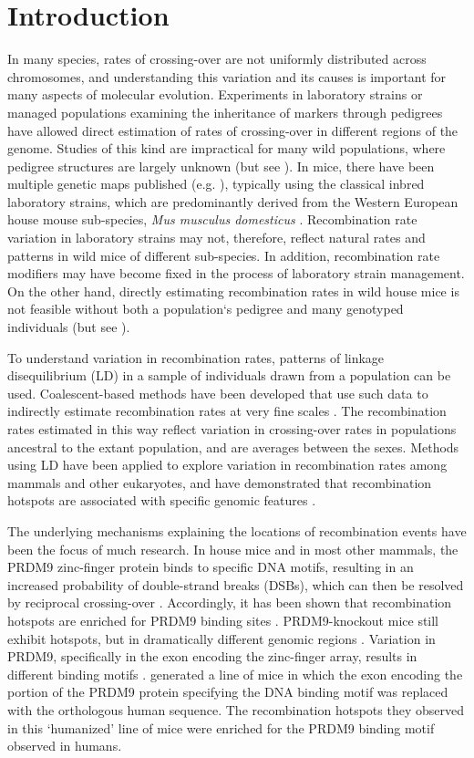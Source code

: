 \section{Introduction}
In many species, rates of crossing-over are not uniformly distributed across chromosomes, and understanding this variation and its causes is important for many aspects of molecular evolution. Experiments in laboratory strains or managed populations examining the inheritance of markers through pedigrees have allowed direct estimation of rates of crossing-over in different regions of the genome. Studies of this kind are impractical for many wild populations, where pedigree structures are largely unknown (but see \citealt{RN250}). In mice, there have been multiple genetic maps published (e.g. \citealt{RN184, RN263, RN232, RN266}), typically using the classical inbred laboratory strains, which are predominantly derived from the Western European house mouse sub-species, \emph{Mus musculus domesticus} \citep{RN243}. Recombination rate variation in laboratory strains may not, therefore, reflect natural rates and patterns in wild mice of different sub-species. In addition, recombination rate modifiers may have become fixed in the process of laboratory strain management. On the other hand, directly estimating recombination rates in wild house mice is not feasible without both a population`s pedigree and many genotyped individuals (but see \citealt{RN267}). 
 
        	To understand variation in recombination rates, patterns of linkage disequilibrium (LD) in a sample of individuals drawn from a population can be used. Coalescent-based methods have been developed that use such data to indirectly estimate recombination rates at very fine scales \citep{RN261,RN182, RN257,RN260,RN213}. The recombination rates estimated in this way reflect variation in crossing-over rates in populations ancestral to the extant population, and are averages between the sexes. Methods using LD have been applied to explore variation in recombination rates among mammals and other eukaryotes, and have demonstrated that recombination hotspots are associated with specific genomic features \citep{RN262, RN247, RN258}.

The underlying mechanisms explaining the locations of recombination events have been the focus of much research. In house mice and in most other mammals, the PRDM9 zinc-finger protein binds to specific DNA motifs, resulting in an increased probability of double-strand breaks (DSBs), which can then be resolved by reciprocal crossing-over \citep{RN248, RN256}. Accordingly, it has been shown that recombination hotspots are enriched for PRDM9 binding sites \citep{RN262,RN156}. PRDM9-knockout mice still exhibit hotspots, but in dramatically different genomic regions \cite{RN254}. Variation in PRDM9, specifically in the exon encoding the zinc-finger array, results in different binding motifs \citep{RN269}. \cite{RN246} generated a line of mice in which the exon encoding the portion of the PRDM9 protein specifying the DNA binding motif was replaced with the orthologous human sequence. The recombination hotspots they observed in this ‘humanized’ line of mice were enriched for the PRDM9 binding motif observed in humans. 

